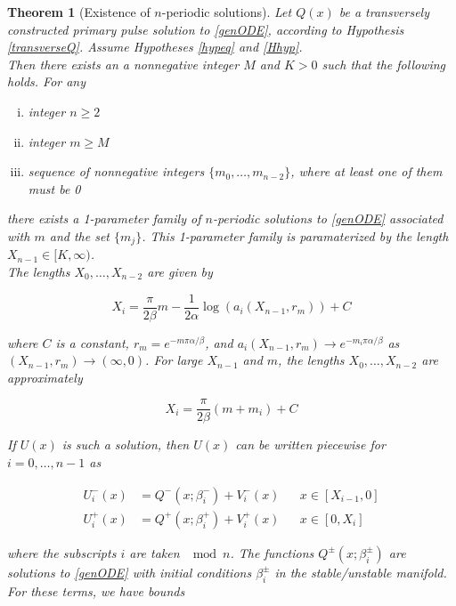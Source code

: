 \documentclass[12pt]{article}
\newtheorem{theorem}{Theorem}
\begin{document}
\begin{theorem}[Existence of $n$-periodic solutions]\label{perexist}
Let $Q(x)$ be a transversely constructed primary pulse solution to \eqref{genODE}, according to Hypothesis \ref{transverseQ}. Assume Hypotheses \ref{hypeq} and \ref{Hhyp}.\\

Then there exists an a nonnegative integer $M$ and $K > 0$ such that the following holds. For any 
\begin{enumerate}[(i)]
\item integer $n \geq 2$ \\
\item integer $m \geq M$ \\
\item sequence of nonnegative integers $\{ m_0, \dots, m_{n-2} \}$, where at least one of them must be 0
\end{enumerate}

there exists a 1-parameter family of $n$-periodic solutions to \eqref{genODE} associated with $m$ and the set $\{ m_j \}$. This 1-parameter family is paramaterized by the length $X_{n-1} \in [K, \infty)$.\\

The lengths $X_0, \dots, X_{n-2}$ are given by

\begin{equation}\label{Xi}
X_i = \frac{\pi}{2 \beta}m 
- \frac{1}{2 \alpha} \log(a_i(X_{n-1}, r_m)) + C
\end{equation}

where $C$ is a constant, $r_m = e^{-m \pi \alpha/\beta}$, and $a_i(X_{n-1}, r_m) \rightarrow e^{-m_i \pi \alpha/ \beta}$ as $(X_{n-1}, r_m) \rightarrow (\infty, 0)$. For large $X_{n-1}$ and $m$, the lengths $X_0, \dots, X_{n-2}$ are approximately

\begin{equation}\label{Xiapprox}
X_i = \frac{\pi}{2 \beta}(m + m_i) + C
\end{equation}

If $U(x)$ is such a solution, then $U(x)$ can be written piecewise for $i = 0, \dots, n-1$ as 

\begin{align}
U_i^-(x) &= Q^-(x; \beta_i^-) + V_i^-(x) && x \in [X_{i-1}, 0] \\
U_i^+(x) &= Q^+(x; \beta_i^+) + V_i^+(x) && x \in [0, X_i]
\end{align}

where the subscripts $i$ are taken $\mod n$. The functions $Q^\pm(x; \beta_i^\pm)$ are solutions to \eqref{genODE} with initial conditions $\beta_i^\pm$ in the stable/unstable manifold. For these terms, we have bounds


\end{theorem}
\end{document}

